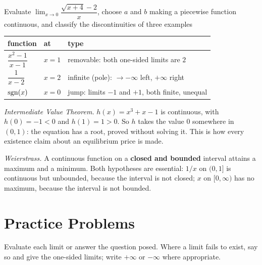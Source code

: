 \begin{worked}{Evaluate $\lim_{x\to0}\dfrac{\sqrt{x+4}-2}{x}$, choose $a$ and $b$ making a piecewise function continuous, and classify the discontinuities of three examples}
\begin{center}\footnotesize
\begin{tabular}{lll}
  \hline
  function & at & type\\
  \hline
  $\dfrac{x^{2}-1}{x-1}$ & $x=1$ & removable: both one-sided limits are $2$\\[0.8ex]
  $\dfrac{1}{x-2}$ & $x=2$ & infinite (pole): $\to-\infty$ left, $+\infty$ right\\[0.8ex]
  $\operatorname{sgn}(x)$ & $x=0$ & jump: limits $-1$ and $+1$, both finite, unequal\\
  \hline
\end{tabular}
\end{center}

\emph{Intermediate Value Theorem.} $h(x)=x^{3}+x-1$ is continuous, with
$h(0)=-1<0$ and $h(1)=1>0$. So $h$ takes the value $0$ somewhere in
$(0,1)$: the equation has a root, proved without solving it. This is how
every existence claim about an equilibrium price is made.

\emph{Weierstrass.} A continuous function on a \textbf{closed and bounded}
interval attains a maximum and a minimum. Both hypotheses are essential:
$1/x$ on $(0,1]$ is continuous but unbounded, because the interval is not
closed; $x$ on $[0,\infty)$ has no maximum, because the interval is not
bounded.
\end{worked}

\section{Practice Problems}

Evaluate each limit or answer the question posed. Where a limit fails to
exist, say so and give the one-sided limits; write $+\infty$ or $-\infty$
where appropriate.

